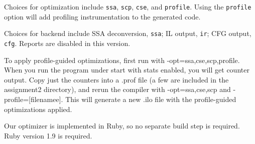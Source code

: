 \documentclass[10pt,twocolumn]{article}
\begin{document}
Choices for optimization include \texttt{ssa}, \texttt{scp},
\texttt{cse}, and \texttt{profile}. Using the \texttt{profile} option
will add profiling instrumentation to the generated code.

Choices for backend include SSA deconversion, \texttt{ssa}; IL output,
\texttt{ir}; CFG output, \texttt{cfg}. Reports are disabled in this
version.

To apply profile-guided optimizations, first run with
-opt=ssa,cse,scp,profile. When you run the program under start with
stats enabled, you will get counter output. Copy just the counters
into a .prof file (a few are included in the assignment2 directory),
and rerun the compiler with -opt=ssa,cse,scp and
-profile=[filenamee]. This will generate a new .ilo file with the
profile-guided optimizations applied.

Our optimizer is implemented in Ruby, so no separate build step is
required. Ruby version 1.9 is required. 






\end{document}
